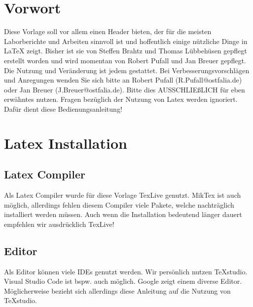 \documentclass[
12pt,
a4paper,
headings=small,                    %
bibliography=totoc,                %
listof=totoc,                      %
parskip=half*,                     %
]{scrartcl}                        %
\begin{document}
	
	
	
	
	
	\tableofcontents
	\newpage
	\section{Vorwort}
	Diese Vorlage soll vor allem einen Header bieten, der für die meisten Laborberichte und Arbeiten sinnvoll ist und hoffentlich einige nützliche Dinge in LaTeX zeigt.\newline
	Bisher ist sie von Steffen Brahtz und Thomas Lübbehüsen gepflegt erstellt worden und wird momentan von Robert Pufall und Jan Breuer gepflegt.\newline
	Die Nutzung und Veränderung ist jedem gestattet. Bei Verbesserungsvorschlägen und Anregungen wenden Sie sich bitte an Robert Pufall (R.Pufall@ostfalia.de) oder Jan Breuer (J.Breuer@ostfalia.de).
	Bitte dies AUSSCHLIEßLICH für eben erwähntes nutzen. Fragen bezüglich der Nutzung von Latex werden ignoriert. Dafür dient diese Bedienungsanleitung!
	
	
	\section{Latex Installation}
	\subsection{Latex Compiler}
	Als Latex Compiler wurde für diese Vorlage TexLive genutzt. MikTex ist auch möglich, allerdings fehlen diesem Compiler viele Pakete, welche nachträglich installiert werden müssen.\newline
	Auch wenn die Installation bedeutend länger dauert empfehlen wir ausdrücklich TexLive!
	\subsection{Editor}
	Als Editor können viele IDEs genutzt werden. Wir persönlich nutzen TeXstudio. Visual Studio Code ist bspw. auch möglich. Google zeigt einem diverse Editor. Möglicherweise bezieht sich allerdings diese Anleitung auf die Nutzung von TeXstudio. 
	
\end{document}

